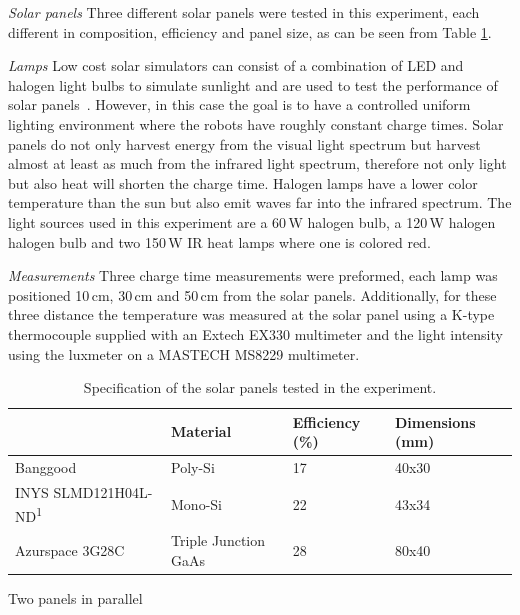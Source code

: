 \textit{Solar panels}
Three different solar panels were tested in this experiment, each different in composition, efficiency and panel size, as can be seen from Table \ref{tab:solar_panels}.

\textit{Lamps}
Low cost solar simulators can consist of a combination of LED and halogen light bulbs to simulate sunlight and are used to test the performance of solar panels~\cite{grandi_tia_2014}.
However, in this case the goal is to have a controlled uniform lighting environment where the robots have roughly constant charge times.
Solar panels do not only harvest energy from the visual light spectrum but harvest almost at least as much from the infrared light spectrum, therefore not only light but also heat will shorten the charge time.
Halogen lamps have a lower color temperature than the sun but also emit waves far into the infrared spectrum.
The light sources used in this experiment are a 60\,W halogen bulb, a 120\,W halogen halogen bulb and two 150\,W IR heat lamps where one is colored red.

\textit{Measurements}
Three charge time measurements were preformed, each lamp was positioned 10\,cm, 30\,cm and 50\,cm from the solar panels.
Additionally, for these three distance the temperature was measured at the solar panel using a K-type thermocouple supplied with an Extech EX330 multimeter and the light intensity using the luxmeter on a MASTECH MS8229 multimeter.

\begin{table}[t]
	\centering
	\begin{threeparttable}
		\caption{Specification of the solar panels tested in the experiment.}
		\label{tab:solar_panels}
		\small
		\begin{tabular}{|l|l|l|l|}
			\hline
			& Material & Efficiency (\%) & Dimensions (mm) \\
			\hline \hline
			Banggood \cite{bangood_solar_2017}& Poly-Si & 17 & 40x30 \\
			INYS SLMD121H04L-ND\textsuperscript{1}& Mono-Si & 22 & 43x34 \\
			Azurspace 3G28C & Triple Junction GaAs& 28 & 80x40 \\
			\hline
		\end{tabular}
		\begin{tablenotes}
			\small
			\item [1] Two panels in parallel
		\end{tablenotes}
	\end{threeparttable}
\end{table}

